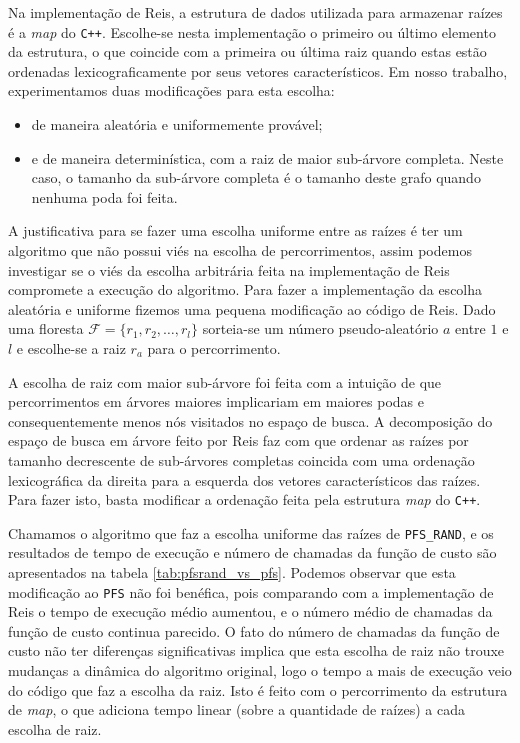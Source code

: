 \documentclass[12pt]{article}
\newcommand{\toolname}[1]{\textit{#1}}
\newcommand{\algname}[1]{\texttt{#1}}
\newcommand{\langname}[1]{\texttt{#1}}
\newcommand{\forest}{\mathcal{F}}
\begin{document}
Na implementação de Reis, a estrutura de dados utilizada para armazenar
raízes é a \toolname{map} do \langname{C++}. Escolhe-se nesta 
implementação o primeiro ou último elemento da estrutura, o que coincide
 com a primeira ou última raiz quando estas estão ordenadas 
lexicograficamente por seus vetores característicos. Em nosso trabalho, 
experimentamos duas modificações para esta escolha:
\begin{itemize}
    \item{de maneira aleatória e uniformemente provável;}
    \item{e de maneira determinística, com a raiz de maior sub-árvore
          completa. Neste caso, o tamanho da sub-árvore completa é o 
          tamanho deste grafo quando nenhuma poda foi feita.}
\end{itemize}

A justificativa para se fazer uma escolha uniforme entre as raízes é
ter um algoritmo que não possui viés na escolha de percorrimentos, assim 
podemos investigar se o viés da escolha arbitrária feita na 
implementação de Reis compromete a execução do algoritmo. Para fazer a 
implementação da escolha aleatória e 
uniforme fizemos uma pequena modificação ao código de Reis. Dado uma 
floresta $\forest = \{r_1, r_2, \dots, r_l\}$ sorteia-se um número 
pseudo-aleatório $a$ entre $1$ e $l$ e escolhe-se a raiz $r_a$ para o 
percorrimento.

A escolha de raiz com maior sub-árvore foi feita com a intuição de que
percorrimentos em árvores maiores implicariam em maiores podas e 
consequentemente menos nós visitados no espaço de busca. A decomposição
do espaço de busca em árvore feito por Reis faz com que ordenar as 
raízes por tamanho decrescente de sub-árvores completas coincida com 
uma ordenação lexicográfica da direita para a esquerda dos vetores 
característicos das raízes. Para fazer isto, basta modificar a 
ordenação feita pela estrutura \toolname{map} do \langname{C++}.

Chamamos o algoritmo que faz a escolha uniforme das raízes de 
\algname{PFS\_RAND}, e os resultados de tempo de execução e número
de chamadas da função de custo são apresentados na tabela 
\ref{tab:pfsrand_vs_pfs}. Podemos observar que esta modificação ao 
\algname{PFS} não foi benéfica, pois comparando com a implementação de 
Reis o tempo de execução médio aumentou, e o número médio de chamadas da 
função de custo continua parecido. O fato do número de chamadas da 
função de custo não ter diferenças significativas implica que esta 
escolha de raiz não trouxe mudanças a dinâmica do algoritmo original, 
logo o tempo a mais de execução veio do código que faz a escolha da 
raiz. Isto é feito com o percorrimento da estrutura de \toolname{map}, 
o que adiciona tempo linear (sobre a quantidade de raízes) a cada 
escolha de raiz.
\end{document}
